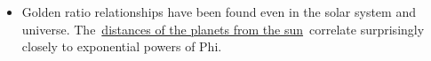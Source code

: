 \documentclass[12pt]{article}
\begin{document}
\begin{itemize}
	\item {\fontsize{10pt}{12.0pt}\selectfont Golden ratio relationships have been found even in the solar system and universe. The \href{https://www.goldennumber.net/solar-system/}{distances of the planets from the sun} correlate surprisingly closely to exponential powers of Phi.  \par}
\end{itemize}\par


\printbibliography
\end{document}
